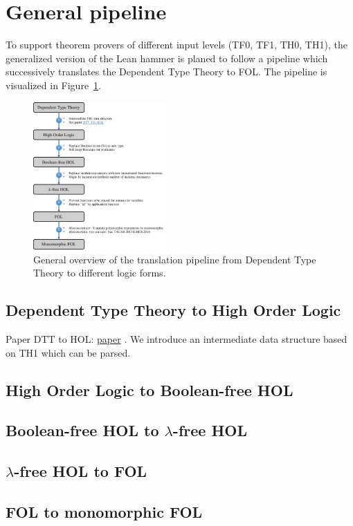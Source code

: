 \documentclass[a4paper]{article}
\begin{document}
\section{General pipeline}
\label{sec:general_pipeline}
To support theorem provers of different input levels (TF0, TF1, TH0, TH1), the generalized version of the Lean hammer is planed to follow a pipeline which successively translates the Dependent Type Theory to FOL. The pipeline is visualized in Figure~\ref{fig:pipeline}.
\begin{figure}[ht!]
	\centering
	\includegraphics[width=0.45\textwidth]{figures/pipeline_DTT_HOL.pdf}
	\caption{General overview of the translation pipeline from Dependent Type Theory to different logic forms.}
	\label{fig:pipeline}
\end{figure}
\subsection{Dependent Type Theory to High Order Logic}
Paper DTT to HOL: \href{https://link.springer.com/chapter/10.1007/BFb0037108}{paper} \cite{DTT2HOL}. We introduce an intermediate data structure based on TH1 which can be parsed. 
\subsection{High Order Logic to Boolean-free HOL}
\subsection{Boolean-free HOL to $\lambda$-free HOL}
\subsection{$\lambda$-free HOL to FOL}
\subsection{FOL to monomorphic FOL}
\end{document}
